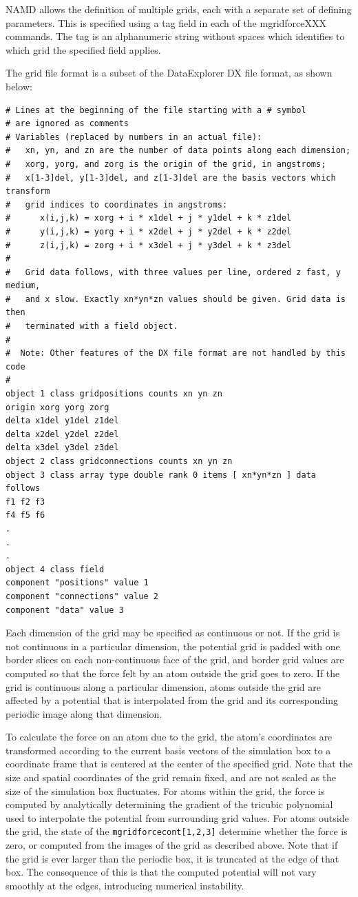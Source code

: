 NAMD allows the definition of multiple grids, each with a separate set of defining 
parameters. This is specified using a tag field in each of the mgridforceXXX commands. 
The tag is an alphanumeric string without spaces which identifies to which grid the 
specified field applies.

The grid file format is a subset of the DataExplorer DX file format, as shown below:
\begin{verbatim}
# Lines at the beginning of the file starting with a # symbol 
# are ignored as comments
# Variables (replaced by numbers in an actual file):
#   xn, yn, and zn are the number of data points along each dimension;
#   xorg, yorg, and zorg is the origin of the grid, in angstroms;
#   x[1-3]del, y[1-3]del, and z[1-3]del are the basis vectors which transform
#   grid indices to coordinates in angstroms:
#      x(i,j,k) = xorg + i * x1del + j * y1del + k * z1del
#      y(i,j,k) = yorg + i * x2del + j * y2del + k * z2del
#      z(i,j,k) = zorg + i * x3del + j * y3del + k * z3del
#
#   Grid data follows, with three values per line, ordered z fast, y medium,
#   and x slow. Exactly xn*yn*zn values should be given. Grid data is then
#   terminated with a field object.
#   
#  Note: Other features of the DX file format are not handled by this code
#
object 1 class gridpositions counts xn yn zn
origin xorg yorg zorg
delta x1del y1del z1del
delta x2del y2del z2del
delta x3del y3del z3del
object 2 class gridconnections counts xn yn zn
object 3 class array type double rank 0 items [ xn*yn*zn ] data follows
f1 f2 f3
f4 f5 f6
.
.
.
object 4 class field
component "positions" value 1
component "connections" value 2
component "data" value 3
\end{verbatim}

Each dimension of the grid may be specified as continuous or not. If the grid is not continuous in a particular dimension, the potential grid is padded with one border slices on each non-continuous face of the grid, and border grid values are computed so that the force felt by an atom outside the grid goes to zero. If the grid is continuous along a particular dimension, atoms outside the grid are affected by a potential that is interpolated from the grid and its corresponding periodic image along that dimension.

To calculate the force on an atom due to the grid, the atom's coordinates are transformed according to the current basis vectors of the simulation box to a coordinate frame that is centered at the center of the specified grid. Note that the size and spatial coordinates of the grid remain fixed, and are not scaled as the size of the simulation box fluctuates. For atoms within the grid, the force is computed by analytically determining the gradient of the tricubic polynomial used to interpolate the potential from surrounding grid values. For atoms outside the grid, the state of the {\tt mgridforcecont[1,2,3]} determine whether the force is zero, or computed from the images of the grid as described above. Note that if the grid is ever larger than the periodic box, it is truncated at the edge of that box. The consequence of this is that the computed potential will not vary smoothly at the edges, introducing numerical instability.

